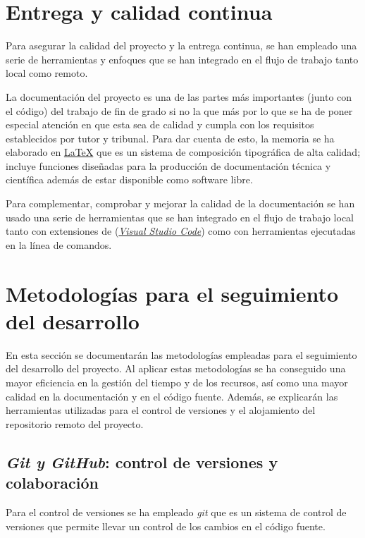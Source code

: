 \section{Entrega y calidad continua}

Para asegurar la calidad del proyecto y la entrega continua, se han empleado una serie de herramientas y enfoques que se han integrado en el flujo de trabajo tanto local como remoto.

La documentación del proyecto es una de las partes más importantes (junto con el código) del trabajo de fin de grado si no la que más por lo que se ha de poner especial atención en que esta sea de calidad y cumpla con los requisitos establecidos por tutor y tribunal. Para dar cuenta de esto, la memoria se ha elaborado en \href{https://www.latex-project.org/}{\LaTeX{}} que es un sistema de composición tipográfica de alta calidad; incluye funciones diseñadas para la producción de documentación técnica y científica además de estar disponible como software libre.

Para complementar, comprobar y mejorar la calidad de la documentación se han usado una serie de herramientas que se han integrado en el flujo de trabajo local tanto con extensiones de (\href{https://code.visualstudio.com/}{\textit{Visual Studio Code}}) como con herramientas ejecutadas en la línea de comandos.

\section{Metodologías para el seguimiento del desarrollo}

En esta sección se documentarán las metodologías empleadas para el seguimiento del desarrollo del proyecto. Al aplicar estas metodologías se ha conseguido una mayor eficiencia en la gestión del tiempo y de los recursos, así como una mayor calidad en la documentación y en el código fuente. Además, se explicarán las herramientas utilizadas para el control de versiones y el alojamiento del repositorio remoto del proyecto.

\subsection{\textit{Git y GitHub}: control de versiones y colaboración}

Para el control de versiones se ha empleado \textit{git} que es un sistema de control de versiones que permite llevar un control de los cambios en el código fuente.

